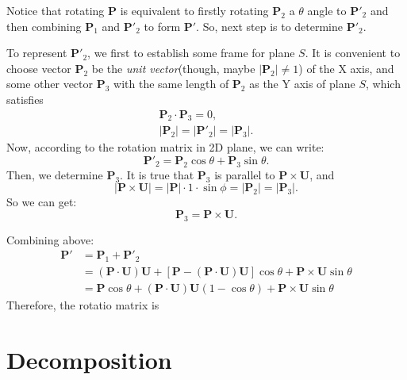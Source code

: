 \documentclass{article}
\begin{document}
Notice that rotating \textbf{P} is equivalent to firstly rotating $\mathbf{P}_2$ a $\theta$ angle to $\mathbf{P}'_2$ and then combining $\mathbf{P}_1$ and $\mathbf{P}'_2$ to form $\mathbf{P}'$. So, next step is to determine $\mathbf{P}'_2$. 

To represent $\mathbf{P}'_2$, we first to establish some frame for plane $S$. It is convenient to choose vector $\mathbf{P}_2$ be the \textit{unit vector}(though, maybe $|\mathbf{P}_2| \ne 1$) of the X axis, and some other vector $\mathbf{P}_3$ with the same length of $\mathbf{P}_2$ as the Y axis of plane $S$, which satisfies
\begin{displaymath}
\begin{split}
\mathbf{P}_2 \cdot \mathbf{P}_3 = 0, \\
|\mathbf{P}_2| = |\mathbf{P}'_2| = |\mathbf{P}_3|.
\end{split}
\end{displaymath}
Now, according to the rotation matrix in 2D plane, we can write:
\begin{displaymath}
\mathbf{P}'_2 = \mathbf{P}_2\cos{\theta} + \mathbf{P}_3\sin{\theta}.
\end{displaymath}
Then, we determine $\mathbf{P}_3$. It is true that $\mathbf{P}_3$ is parallel to $\mathbf{P}\times\mathbf{U}$, and 
\begin{displaymath}
|\mathbf{P}\times\mathbf{U}| = |\mathbf{P}| \cdot 1 \cdot \sin{\phi} = |\mathbf{P}_2| = |\mathbf{P}_3|.
\end{displaymath}
So we can get:
\begin{displaymath}
\mathbf{P}_3 = \mathbf{P}\times\mathbf{U}.
\end{displaymath}

Combining above:
\begin{displaymath}
\begin{split}
\mathbf{P}' &= \mathbf{P}_1 + \mathbf{P}'_2 \\
 &= (\mathbf{P}\cdot\mathbf{U})\mathbf{U} + [\mathbf{P}-(\mathbf{P}\cdot\mathbf{U})\mathbf{U}]\cos{\theta}+\mathbf{P}\times\mathbf{U}\sin{\theta} \\
 &= \mathbf{P}\cos{\theta} + (\mathbf{P}\cdot\mathbf{U})\mathbf{U}(1-\cos{\theta})+\mathbf{P}\times\mathbf{U}\sin{\theta}
\end{split}
\end{displaymath}
Therefore, the rotatio matrix is
\begin{displaymath}
\end{displaymath}

\section{Decomposition}
\end{document}
